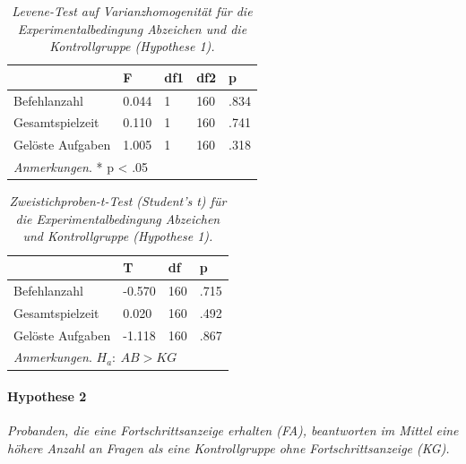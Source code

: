 \begin{table}[htbp]
\centering
\caption{\textit{Levene-Test auf Varianzhomogenität für die Experimentalbedingung Abzeichen und die Kontrollgruppe (Hypothese 1).}}
\begin{tabular}{ p{4cm} p{2.0cm} p{2.0cm} p{2.0cm} p{2.0cm} }
 \hline
 & F & df1 &df2 &p \\
 \hline
  Befehlanzahl      & 0.044    & 1 &   160 & .834\\
  Gesamtspielzeit   & 0.110    & 1 &   160 & .741\\
  Gelöste Aufgaben  & 1.005    & 1 &   160 & .318\\
 \hline
 \multicolumn{5}{l}{%
 \small%
\textit{Anmerkungen}. * p < .05
}\\
\end{tabular}
\label{levene_hypo_1}
\end{table}
\begin{table}[htbp]
\centering
\caption{\textit{Zweistichproben-t-Test (Student's t) für die Experimentalbedingung Abzeichen und Kontrollgruppe (Hypothese 1).}}
\begin{tabular}{ p{4cm} p{2.0cm} p{2.0cm} p{2.0cm} }
 \hline
 & T &df & p \\
 \hline
  Befehlanzahl       & -0.570  &   160 & .715\\
  Gesamtspielzeit    &  0.020  &   160 & .492\\
  Gelöste Aufgaben   & -1.118  &   160 & .867\\
 \hline
 \multicolumn{4}{l}{%
 \small%
\textit{Anmerkungen}. $H_a:\: AB > KG$
}\\
\end{tabular}
\label{ttest_hypo_1}
\end{table}



\paragraph{Hypothese 2 }
\begin{center}
    \textit{Probanden, die eine Fortschrittsanzeige erhalten (FA), beantworten im Mittel eine höhere Anzahl an Fragen als eine Kontrollgruppe ohne Fortschrittsanzeige (KG).} 
\end{center}

